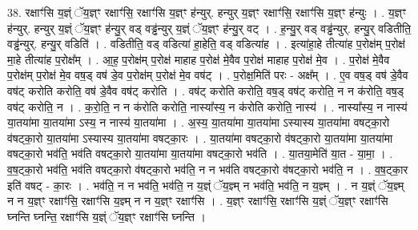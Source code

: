 \documentclass[17pt]{extarticle}
\begin{document}
38. रक्षाꣳ॑सि य॒ज्ञ्ं ॅय॒ज्ञ्ꣳ रक्षाꣳ॑सि॒ रक्षाꣳ॑सि य॒ज्ञ्ꣳ ह॑न्युर्. हन्युर् य॒ज्ञ्ꣳ रक्षाꣳ॑सि॒ रक्षाꣳ॑सि य॒ज्ञ्ꣳ ह॑न्युः । . य॒ज्ञ्ꣳ ह॑न्युर्. हन्युर् य॒ज्ञ्ं ॅय॒ज्ञ्ꣳ ह॑न्यु॒र् वड् वड्ढ॑न्युर् य॒ज्ञ्ं ॅय॒ज्ञ्ꣳ ह॑न्यु॒र् वट् । . ह॒न्यु॒र् वड् वड्ढ॑न्युर्. हन्यु॒र् वडितीति॒ वड्ढ॑न्युर्. हन्यु॒र् वडिति॑ । . वडितीति॒ वड् वडित्या॑ हा॒हेति॒ वड् वडित्या॑ह । . इत्या॑हा॒हे तीत्या॑ह प॒रोक्ष॑म् प॒रोक्ष॑ मा॒हे तीत्या॑ह प॒रोक्ष᳚म् । . आ॒ह॒ प॒रोक्ष॑म् प॒रोक्ष॑ माहाह प॒रोक्ष॑ मे॒वैव प॒रोक्ष॑ माहाह प॒रोक्ष॑ मे॒व । . प॒रोक्ष॑ मे॒वैव प॒रोक्ष॑म् प॒रोक्ष॑ मे॒व वष॒ड् वष॑ डे॒व प॒रोक्ष॑म् प॒रोक्ष॑ मे॒व वष॑ट् । . प॒रोक्ष॒मिति॑ परः - अक्ष᳚म् । . ए॒व वष॒ड् वष॑ डे॒वैव वष॑ट् करोति करोति॒ वष॑ डे॒वैव वष॑ट् करोति । . वष॑ट् करोति करोति॒ वष॒ड् वष॑ट् करोति॒ न न क॑रोति॒ वष॒ड् वष॑ट् करोति॒ न । . क॒रो॒ति॒ न न क॑रोति करोति॒ नास्या᳚स्य॒ न क॑रोति करोति॒ नास्य॑ । . नास्या᳚स्य॒ न नास्य॑ या॒तया॑मा या॒तया॑मा ऽस्य॒ न नास्य॑ या॒तया॑मा । . अ॒स्य॒ या॒तया॑मा या॒तया॑मा ऽस्यास्य या॒तया॑मा वषट्का॒रो व॑षट्का॒रो या॒तया॑मा ऽस्यास्य या॒तया॑मा वषट्का॒रः । . या॒तया॑मा वषट्का॒रो व॑षट्का॒रो या॒तया॑मा या॒तया॑मा वषट्का॒रो भव॑ति॒ भव॑ति वषट्का॒रो या॒तया॑मा या॒तया॑मा वषट्का॒रो भव॑ति । . या॒तया॒मेति॑ या॒त - या॒मा॒ । . व॒ष॒ट्का॒रो भव॑ति॒ भव॑ति वषट्का॒रो व॑षट्का॒रो भव॑ति॒ न न भव॑ति वषट्का॒रो व॑षट्का॒रो भव॑ति॒ न । . व॒ष॒ट्का॒र इति॑ वषट् - का॒रः । . भव॑ति॒ न न भव॑ति॒ भव॑ति॒ न य॒ज्ञ्ं ॅय॒ज्ञ्म् न भव॑ति॒ भव॑ति॒ न य॒ज्ञ्म् । . न य॒ज्ञ्ं ॅय॒ज्ञ्म् न न य॒ज्ञ्ꣳ रक्षाꣳ॑सि॒ रक्षाꣳ॑सि य॒ज्ञ्म् न न य॒ज्ञ्ꣳ रक्षाꣳ॑सि । . य॒ज्ञ्ꣳ रक्षाꣳ॑सि॒ रक्षाꣳ॑सि य॒ज्ञ्ं ॅय॒ज्ञ्ꣳ रक्षाꣳ॑सि घ्नन्ति घ्नन्ति॒ रक्षाꣳ॑सि य॒ज्ञ्ं ॅय॒ज्ञ्ꣳ रक्षाꣳ॑सि घ्नन्ति । \newline
\end{document}
